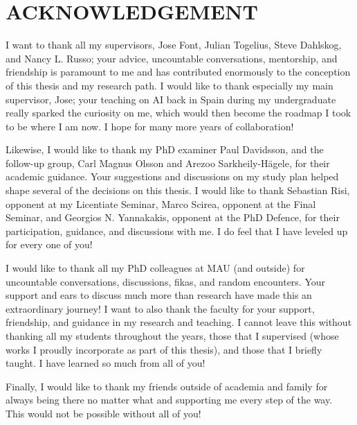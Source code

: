 \documentclass[hidelinks,green,onecolumn,twoside]{dissertation}
\begin{document}

\cleardoublepage
{}
{}
\section*{ACKNOWLEDGEMENT} \normalfont


I want to thank all my supervisors, Jose Font, Julian Togelius, Steve Dahlskog, and Nancy L. Russo; your advice, uncountable conversations, mentorship, and friendship is paramount to me and has contributed enormously to the conception of this thesis and my research path. I would like to thank especially my main supervisor, Jose; your teaching on AI back in Spain during my undergraduate really sparked the curiosity on me, which would then become the roadmap I took to be where I am now. I hope for many more years of collaboration! 



Likewise, I would like to thank my PhD examiner Paul Davidsson, and the follow-up group, Carl Magnus Olsson and Arezoo Sarkheily-Hägele, for their academic guidance. Your suggestions and discussions on my study plan helped shape several of the decisions on this thesis. I would like to thank Sebastian Risi, opponent at my Licentiate Seminar, Marco Scirea, opponent at the Final Seminar, and Georgios N. Yannakakis, opponent at the PhD Defence, for their participation, guidance, and discussions with me. I do feel that I have leveled up for every one of you! 

I would like to thank all my PhD colleagues at MAU (and outside) for uncountable conversations, discussions, fikas, and random encounters. Your support and ears to discuss much more than research have made this an extraordinary journey! I want to also thank the faculty for your support, friendship, and guidance in my research and teaching. I cannot leave this without thanking all my students throughout the years, those that I supervised (whose works I proudly incorporate as part of this thesis), and those that I briefly taught. I have learned so much from all of you!

Finally, I would like to thank my friends outside of academia and family for always being there no matter what and supporting me every step of the way. This would not be possible without all of you! 
\end{document}
